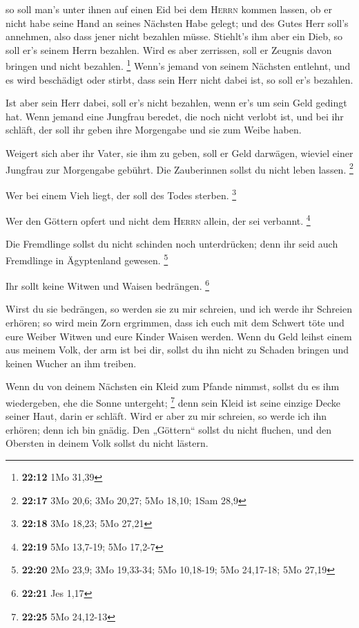  so soll man's unter ihnen auf einen Eid bei dem
\textsc{Herrn} kommen lassen, ob er nicht habe seine Hand an seines
Nächsten Habe gelegt; und des Gutes Herr soll's annehmen, also dass
jener nicht bezahlen müsse.  Stiehlt's ihm aber ein Dieb,
so soll er's seinem Herrn bezahlen.  Wird es aber
zerrissen, soll er Zeugnis davon bringen und nicht bezahlen. \footnote{\textbf{22:12}
  1Mo 31,39}  Wenn's jemand von seinem Nächsten entlehnt,
und es wird beschädigt oder stirbt, dass sein Herr nicht dabei ist, so
soll er's bezahlen.

 Ist aber sein Herr dabei, soll er's nicht bezahlen, wenn
er's um sein Geld gedingt hat.  Wenn jemand eine Jungfrau
beredet, die noch nicht verlobt ist, und bei ihr schläft, der soll ihr
geben ihre Morgengabe und sie zum Weibe haben.

 Weigert sich aber ihr Vater, sie ihm zu geben, soll er
Geld darwägen, wieviel einer Jungfrau zur Morgengabe gebührt.
 Die Zauberinnen sollst du nicht leben lassen.
\footnote{\textbf{22:17} 3Mo 20,6; 3Mo 20,27; 5Mo 18,10; 1Sam 28,9}

 Wer bei einem Vieh liegt, der soll des Todes sterben.
\footnote{\textbf{22:18} 3Mo 18,23; 5Mo 27,21}

 Wer den Göttern opfert und nicht dem \textsc{Herrn}
allein, der sei verbannt. \footnote{\textbf{22:19} 5Mo 13,7-19; 5Mo
  17,2-7}

 Die Fremdlinge sollst du nicht schinden noch
unterdrücken; denn ihr seid auch Fremdlinge in Ägyptenland gewesen.
\footnote{\textbf{22:20} 2Mo 23,9; 3Mo 19,33-34; 5Mo 10,18-19; 5Mo
  24,17-18; 5Mo 27,19}

 Ihr sollt keine Witwen und Waisen bedrängen. \footnote{\textbf{22:21}
  Jes 1,17}

 Wirst du sie bedrängen, so werden sie zu mir schreien,
und ich werde ihr Schreien erhören;  so wird mein Zorn
ergrimmen, dass ich euch mit dem Schwert töte und eure Weiber Witwen und
eure Kinder Waisen werden.  Wenn du Geld leihst einem aus
meinem Volk, der arm ist bei dir, sollst du ihn nicht zu Schaden bringen
und keinen Wucher an ihm treiben.

 Wenn du von deinem Nächsten ein Kleid zum Pfande nimmst,
sollst du es ihm wiedergeben, ehe die Sonne untergeht; \footnote{\textbf{22:25}
  5Mo 24,12-13}  denn sein Kleid ist seine einzige Decke
seiner Haut, darin er schläft. Wird er aber zu mir schreien, so werde
ich ihn erhören; denn ich bin gnädig.  Den „Göttern``
sollst du nicht fluchen, und den Obersten in deinem Volk sollst du nicht
lästern.

